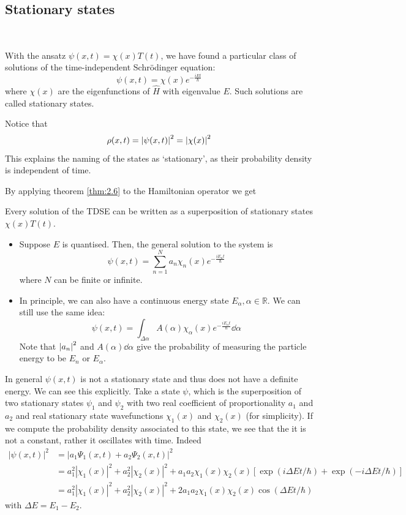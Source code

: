 \documentclass[a4paper,11pt]{article}
\begin{document}
\subsection{Stationary states}\ \vspace{-1.5em}
\begin{definition}
	With the ansatz \( \psi(x,t) = \chi(x) T(t) \), we have found a particular class of solutions of the time-independent Schr\"odinger equation:
	\[
		\psi(x,t) = \chi(x) e^{-\frac{i E t}{\hbar}}
	\]
	where \( \chi(x) \) are the eigenfunctions of \( \hat H \) with eigenvalue \( E \).
	Such solutions are called stationary states.
\end{definition}

\begin{note}
    Notice that \[
        \rho(x,t) = \abs{\psi(x,t)}^2 = \abs{\chi(x)}^2
    \]
    This explains the naming of the states as `stationary', as their probability density is independent of time.
\end{note}

By applying theorem \ref{thm:2.6} to the Hamiltonian operator we get
\begin{theorem}
    Every solution of the TDSE can be written as a superposition of stationary states $\chi(x) T(t)$.
\end{theorem}

\begin{itemize}
    \item Suppose \( E \) is quantised.
    Then, the general solution to the system is
    \[
        \psi(x,t) = \sum_{n=1}^N a_n \chi_n(x) e^{-\frac{iE_n t}{\hbar}}
    \]
    where \( N \) can be finite or infinite.
    \item In principle, we can also have a continuous energy state \( E_\alpha, \alpha \in \mathbb R \).
    We can still use the same idea:
    \[
        \psi(x,t) = \int_{\Delta \alpha} A(\alpha) \chi_\alpha(x) e^{-\frac{iE_\alpha t}{\hbar}} \dd{\alpha}
    \]
    Note that \( \abs{a_n}^2 \) and \( A(\alpha) \dd{\alpha} \) give the probability of measuring the particle energy to be \( E_n \) or \( E_\alpha \).
\end{itemize}

In general $\psi(x, t)$ is not a stationary state and thus does not have a definite energy. We can see this explicitly. Take a state $\psi$, which is the superposition of two stationary states $\psi_1$ and $\psi_2$ with two real coefficient of proportionality $a_1$ and $a_2$ and real stationary state wavefunctions $\chi_1(x)$ and $\chi_2(x)$ (for simplicity). If we compute the probability density associated to this state, we see that the it is not a constant, rather it oscillates with time. Indeed
\[
\begin{aligned}
|\psi(x, t)|^2 &=\left|a_1 \Psi_1(x, t)+a_2 \Psi_2(x, t)\right|^2 \\
&=a_1^2\left|\chi_1(x)\right|^2+a_2^2\left|\chi_2(x)\right|^2+a_1 a_2 \chi_1(x) \chi_2(x)[\exp (i \Delta E t / \hbar)+\exp (-i \Delta E t / \hbar)] \\
&=a_1^2\left|\chi_1(x)\right|^2+a_2^2\left|\chi_2(x)\right|^2+2 a_1 a_2 \chi_1(x) \chi_2(x) \cos (\Delta E t / \hbar)
\end{aligned}
\]
with $\Delta E=E_1-E_2$.
\clearpage
\end{document}

